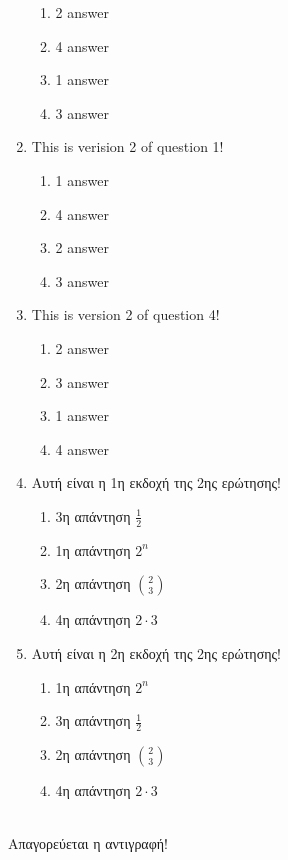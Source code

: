 \documentclass[a4paper, 11pt]{article}
\begin{document}
\begin{enumerate}
\begin{enumerate}[(1)]
    \item 2 answer
    \item 4 answer
    \item 1 answer
    \item 3 answer
\end{enumerate}
\item This is verision 2 of question 1!
\begin{enumerate}[(1)]
    \item 1 answer
    \item 4 answer
    \item 2 answer
    \item 3 answer
\end{enumerate}
\item This is version 2 of question 4!
\begin{enumerate}[(1)]
    \item 2 answer
    \item 3 answer
    \item 1 answer
    \item 4 answer
\end{enumerate}
\item Αυτή είναι η 1η εκδοχή της 2ης ερώτησης!
\begin{enumerate}[(1)]
    \item 3η απάντηση $\frac{1}{2}$
    \item 1η απάντηση $2^n$
    \item 2η απάντηση $\binom{2}{3}$
    \item 4η απάντηση $2\cdot 3$
\end{enumerate}
\item Αυτή είναι η 2η εκδοχή της 2ης ερώτησης!
\begin{enumerate}[(1)]
    \item 1η απάντηση $2^n$
    \item 3η απάντηση $\frac{1}{2}$
    \item 2η απάντηση $\binom{2}{3}$
    \item 4η απάντηση $2\cdot 3$
\end{enumerate}
\end{enumerate}
\hrulefill \\ 

Απαγορεύεται η αντιγραφή! 

\newpage 
\end{document}
